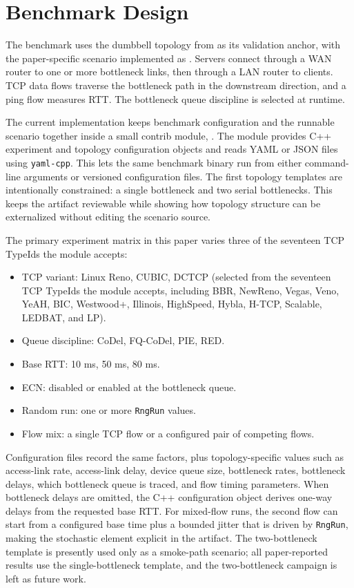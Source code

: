 \section{Benchmark Design}

The benchmark uses the dumbbell topology from \TcpValidation{} as its validation anchor, with the paper-specific scenario implemented as \TcpAqmBenchmark{}. Servers connect through a WAN router to one or more bottleneck links, then through a LAN router to clients. TCP data flows traverse the bottleneck path in the downstream direction, and a ping flow measures RTT. The bottleneck queue discipline is selected at runtime.

The current implementation keeps benchmark configuration and the runnable scenario together inside a small contrib module, \TcpAqmModule{}. The module provides C++ experiment and topology configuration objects and reads YAML or JSON files using \texttt{yaml-cpp}. This lets the same benchmark binary run from either command-line arguments or versioned configuration files. The first topology templates are intentionally constrained: a single bottleneck and two serial bottlenecks. This keeps the artifact reviewable while showing how topology structure can be externalized without editing the scenario source.

The primary experiment matrix in this paper varies three of the seventeen TCP TypeIds the module accepts:

\begin{itemize}
  \item TCP variant: Linux Reno, CUBIC, DCTCP (selected from the seventeen TCP TypeIds the module accepts, including BBR, NewReno, Vegas, Veno, YeAH, BIC, Westwood+, Illinois, HighSpeed, Hybla, H-TCP, Scalable, LEDBAT, and LP).
  \item Queue discipline: CoDel, FQ-CoDel, PIE, RED.
  \item Base RTT: 10 ms, 50 ms, 80 ms.
  \item ECN: disabled or enabled at the bottleneck queue.
  \item Random run: one or more \texttt{RngRun} values.
  \item Flow mix: a single TCP flow or a configured pair of competing flows.
\end{itemize}

Configuration files record the same factors, plus topology-specific values such as access-link rate, access-link delay, device queue size, bottleneck rates, bottleneck delays, which bottleneck queue is traced, and flow timing parameters. When bottleneck delays are omitted, the C++ configuration object derives one-way delays from the requested base RTT. For mixed-flow runs, the second flow can start from a configured base time plus a bounded jitter that is driven by \texttt{RngRun}, making the stochastic element explicit in the artifact. The two-bottleneck template is presently used only as a smoke-path scenario; all paper-reported results use the single-bottleneck template, and the two-bottleneck campaign is left as future work.

